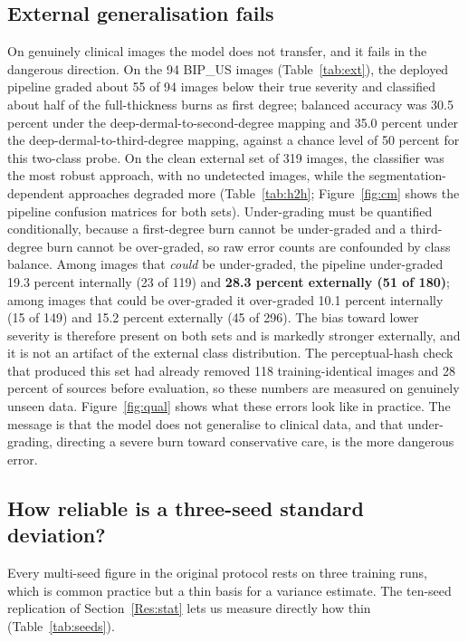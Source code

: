 \documentclass{elektr}
\begin{document}
\subsection{External generalisation fails}
\label{Res:ext}
On genuinely clinical images the model does not transfer, and it fails in the dangerous direction. On the 94 BIP\_US images (Table~\ref{tab:ext}), the deployed pipeline graded about 55 of 94 images below their true severity and classified about half of the full-thickness burns as first degree; balanced accuracy was 30.5 percent under the deep-dermal-to-second-degree mapping and 35.0 percent under the deep-dermal-to-third-degree mapping, against a chance level of 50 percent for this two-class probe. On the clean external set of 319 images, the classifier was the most robust approach, with no undetected images, while the segmentation-dependent approaches degraded more (Table~\ref{tab:h2h}; Figure~\ref{fig:cm} shows the pipeline confusion matrices for both sets). Under-grading must be quantified conditionally, because a first-degree burn cannot be under-graded and a third-degree burn cannot be over-graded, so raw error counts are confounded by class balance. Among images that \emph{could} be under-graded, the pipeline under-graded 19.3 percent internally (23 of 119) and \textbf{28.3 percent externally (51 of 180)}; among images that could be over-graded it over-graded 10.1 percent internally (15 of 149) and 15.2 percent externally (45 of 296). The bias toward lower severity is therefore present on both sets and is markedly stronger externally, and it is not an artifact of the external class distribution. The perceptual-hash check that produced this set had already removed 118 training-identical images and 28 percent of sources before evaluation, so these numbers are measured on genuinely unseen data. Figure~\ref{fig:qual} shows what these errors look like in practice. The message is that the model does not generalise to clinical data, and that under-grading, directing a severe burn toward conservative care, is the more dangerous error.


\subsection{How reliable is a three-seed standard deviation?}
\label{Res:seeds}
Every multi-seed figure in the original protocol rests on three training runs, which is common practice
but a thin basis for a variance estimate. The ten-seed replication of Section~\ref{Res:stat} lets us
measure directly how thin (Table~\ref{tab:seeds}).
\end{document}
